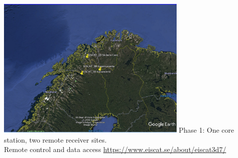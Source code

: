 \begin{frame}[fragile,t]
\frametitle{\hfill}
\vspace{0.1in}
\begin{center}
\includegraphics[height=2.7in]{EISCAT_3D_locations.jpg}
\vfill
    {\colblack Phase 1: One core station, two remote receiver sites.\\Remote control and data access}
    {\small \url{https://www.eiscat.se/about/eiscat3d7/}}
\end{center}
\end{frame}

